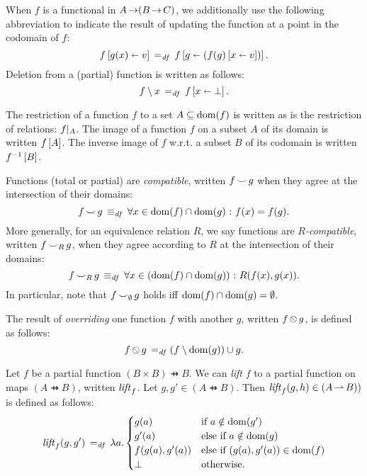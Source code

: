 \documentclass[11pt]{report}
\begin{document}
When $f$ is a functional in $A \operatorname{\rightarrow} (B \operatorname{\rightarrow} C)$, we additionally use the following abbreviation to indicate the result of updating the function at a point in the codomain of $f$: \begin{equation}
	\label{eq:recup}
	f \left[ g(x) \shortleftarrow v \right] \operatorname{\;=_{\mathit{df}}\;} f \left[ g \shortleftarrow \left(f(g) \left[ x \shortleftarrow v \right]\right) \right].
\end{equation}
Deletion from a (partial) function is written as follows: \begin{equation}
	\label{eq:fundel}
	f \setminus x  \operatorname{\;=_{\mathit{df}}\;} f \left[ x \shortleftarrow \bot \right].
\end{equation} 

The restriction of a function $f$ to a set $A \subseteq \operatorname{\mathrm{dom}}(f)$ is written as is the restriction of relations: $f |_{A}$. The image of a function $f$ on a subset $A$ of its domain is written $f\left[A\right]$. The inverse image of $f$ w.r.t. a subset $B$ of its codomain is written $f^{-1}\left[B\right]$.

Functions (total or partial) are \emph{compatible}, written $f \operatorname{\smile} g$ when they agree at the intersection of their domains: \[ f \operatorname{\smile} g \operatorname{\;\equiv_{\mathit{df}}\;} \forall x \in \operatorname{\mathrm{dom}}(f) \cap \operatorname{\mathrm{dom}}(g) \operatorname{\,:\,} f(x) = f(g).\] More generally, for an equivalence relation $R$, we say functions are \emph{$R$-compatible}, written $f \operatorname{\smile}_R g$, when they agree according to $R$ at the intersection of their domains: \[ f \operatorname{\smile}_R g \operatorname{\;\equiv_{\mathit{df}}\;} \forall x \in \left(\operatorname{\mathrm{dom}}(f) \cap \operatorname{\mathrm{dom}}(g)\right) \operatorname{\,:\,} R(f(x),g(x)).\] In particular, note that $f \operatorname{\smile}_{\operatorname{\emptyset}} g$ holds iff $\operatorname{\mathrm{dom}}(f) \cap \operatorname{\mathrm{dom}}(g) = \operatorname{\emptyset}$. 

The result of \emph{overriding} one function $f$ with another $g$, written $f \override g$, is defined as follows: \[ f \override g \eqdef (f \setminus \dom{g}) \cup g.\] 

Let $f$ be a partial function $(B \times B) \pfun B$. We can \emph{lift} $f$ to a partial function on maps $(A \pfun B)$, written $\mathit{lift}_{f}$. Let $g,g' \in (A \pfun B)$. Then $\mathit{lift}_{f}(g,h) \in (A \operatorname{\rightharpoonup} B))$ is defined as follows: \begin{eqnarray*}
	\mathit{lift}_{f}(g,g') \operatorname{\;=_{\mathit{df}}\;} \lambda a . \begin{cases}
		g(a) & \text{if $a \notin \operatorname{\mathrm{dom}}(g')$} \\
		g'(a) & \text{else if $a \notin \operatorname{\mathrm{dom}}(g)$} \\
		f(g(a), g'(a)) & \text{else if $(g(a), g'(a)) \in \operatorname{\mathrm{dom}}(f)$} \\
		\bot & \text{otherwise.}
	\end{cases}
\end{eqnarray*}  
\end{document}
